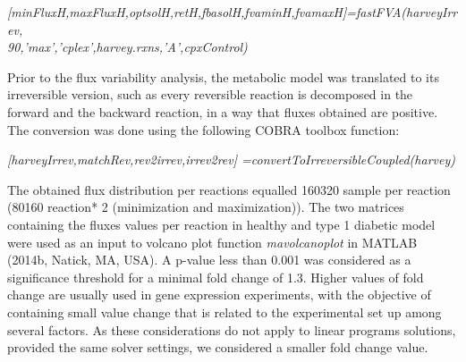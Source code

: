 \begin{center} 
\textit{{[}minFluxH,maxFluxH,optsolH,retH,fbasolH,fvaminH,fvamaxH{]}=fastFVA(harveyIrrev,\\90,'max','cplex',harvey.rxns,'A',cpxControl)} \\
\end{center}
Prior to the flux variability analysis, the metabolic model was translated to its irreversible version, such as every reversible reaction is decomposed in the forward and the backward reaction, in a way that fluxes obtained are positive. The conversion was done using the following COBRA toolbox function:\\
\begin{center}
\textit{{[}harveyIrrev,matchRev,rev2irrev,irrev2rev{]}
=convertToIrreversibleCoupled(harvey)}\\
\end{center}
The obtained flux distribution per reactions equalled 160320 sample per reaction (80160 reaction* 2 (minimization and maximization)). The two matrices containing the fluxes values per reaction in healthy and type 1 diabetic model were used as an input to volcano plot function \textit{mavolcanoplot} in MATLAB (2014b, Natick, MA, USA). A p-value less than 0.001 was considered as a significance threshold for a minimal fold change of 1.3. Higher values of fold change are usually used in gene expression experiments, with the objective of containing small value change that is related to the experimental set up among several factors. As these considerations do not apply to linear programs solutions, provided the same solver settings, we considered a smaller fold change value.
